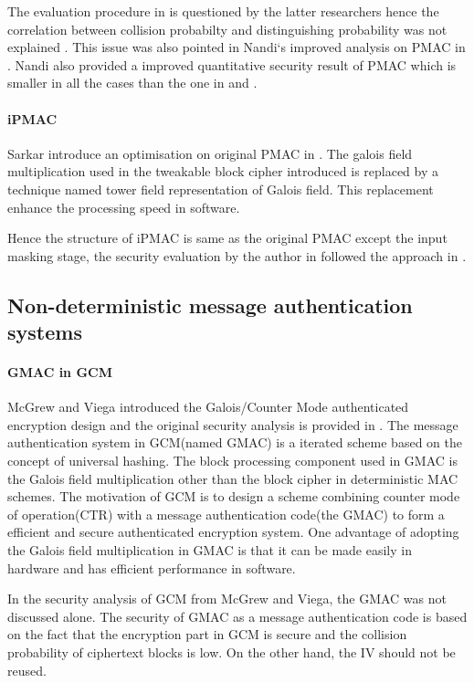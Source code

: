 \documentclass{article}
\begin{document}
The evaluation procedure in \cite{pmac} is questioned by the latter researchers hence the correlation between collision probabilty and 
distinguishing probability was not explained . This issue was also pointed in Nandi`s improved analysis on PMAC in \cite{improve_pmac}. Nandi also provided a improved quantitative security result of PMAC which is smaller in all the cases than the one in \cite{pmac} and \cite{new}. 

\paragraph{iPMAC}
Sarkar introduce an optimisation on original PMAC in \cite{iPMAC}. The galois field multiplication used in the tweakable block cipher introduced is replaced by a technique named tower field representation of Galois field. This replacement enhance the processing speed in software.

Hence the structure of iPMAC is same as the original PMAC except the input masking stage, the security evaluation by the author in \cite{iPMAC} followed the approach in \cite{pmac}.

\subsection{Non-deterministic message authentication systems}
\paragraph{GMAC in GCM}
McGrew and Viega introduced the Galois/Counter Mode authenticated encryption design and the original security analysis is provided in \cite{gcm}. The message authentication system in GCM(named GMAC) is a iterated scheme based on the concept of universal hashing. The block processing component used in GMAC is the Galois field multiplication other than the block cipher in deterministic MAC schemes. 
The motivation of GCM is to design a scheme combining counter mode of operation(CTR) with a message authentication code(the GMAC) to form a efficient and secure authenticated encryption system.
One advantage of adopting the Galois field multiplication in GMAC is that it can be made easily in hardware and has efficient performance in software. 

In the security analysis of GCM from McGrew and Viega, the GMAC was not discussed alone. The security of GMAC as a message authentication code is based on the fact that the encryption part in GCM is secure and the collision probability of ciphertext blocks is low. On the other hand, the IV should not be reused. 
\end{document}
